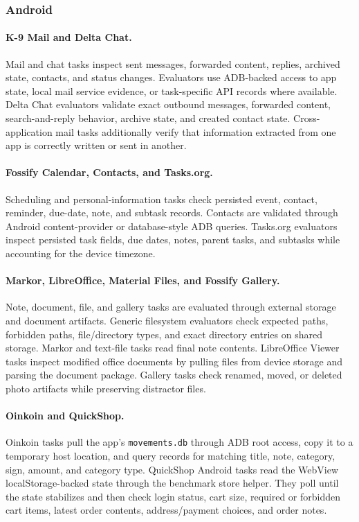 \subsubsection{Android}
\paragraph{K-9 Mail and Delta Chat.}
Mail and chat tasks inspect sent messages, forwarded content, replies, archived state, contacts, and status changes. Evaluators use ADB-backed access to app state, local mail service evidence, or task-specific API records where available. Delta Chat evaluators validate exact outbound messages, forwarded content, search-and-reply behavior, archive state, and created contact state. Cross-application mail tasks additionally verify that information extracted from one app is correctly written or sent in another.

\paragraph{Fossify Calendar, Contacts, and Tasks.org.}
Scheduling and personal-information tasks check persisted event, contact, reminder, due-date, note, and subtask records. Contacts are validated through Android content-provider or database-style ADB queries. Tasks.org evaluators inspect persisted task fields, due dates, notes, parent tasks, and subtasks while accounting for the device timezone.

\paragraph{Markor, LibreOffice, Material Files, and Fossify Gallery.}
Note, document, file, and gallery tasks are evaluated through external storage and document artifacts. Generic filesystem evaluators check expected paths, forbidden paths, file/directory types, and exact directory entries on shared storage. Markor and text-file tasks read final note contents. LibreOffice Viewer tasks inspect modified office documents by pulling files from device storage and parsing the document package. Gallery tasks check renamed, moved, or deleted photo artifacts while preserving distractor files.

\paragraph{Oinkoin and QuickShop.}
Oinkoin tasks pull the app's \texttt{movements.db} through ADB root access, copy it to a temporary host location, and query records for matching title, note, category, sign, amount, and category type. QuickShop Android tasks read the WebView localStorage-backed state through the benchmark store helper. They poll until the state stabilizes and then check login status, cart size, required or forbidden cart items, latest order contents, address/payment choices, and order notes.

